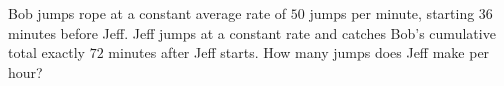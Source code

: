 Bob jumps rope at a constant average rate of $50$ jumps per minute, starting $36$ minutes before Jeff. Jeff jumps at a constant rate and catches Bob's cumulative total exactly $72$ minutes after Jeff starts. How many jumps does Jeff make per hour?
